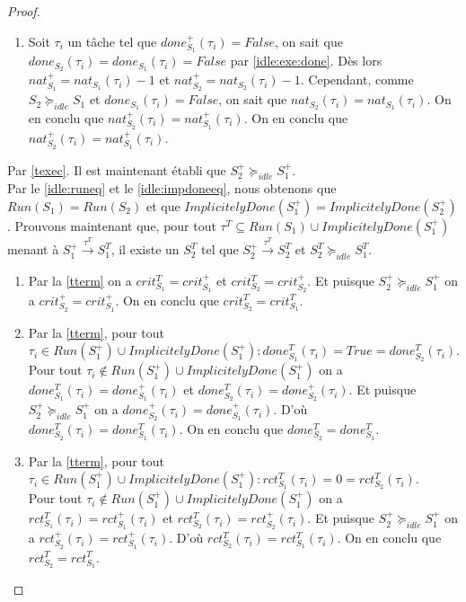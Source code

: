 \documentclass[11pt,a4paper,oneside]{book}
\theoremstyle{break}
\theoremstyle{breakplain}
\begin{document}
\begin{proof}
\begin{enumerate}
\item Soit $\tau_i$ un tâche tel que $done_{S_1}^+(\tau_i) = False$, on sait que $done_{S_2}(\tau_i) = done_{S_1}(\tau_i) = False$ par \autoref{idle:exe:done}. Dès lors $ nat_{S_1}^+ = nat_{S_1}(\tau_i)-1$ et $nat_{S_2}^+ = nat_{S_2}(\tau_i)-1$. Cependant, comme $S_2 \succeq_{idle} S_1$ et $done_{S_1}(\tau_i) = False$, on sait que $nat_{S_2}(\tau_i) = nat_{S_1}(\tau_i)$. On en conclu que $nat_{S_2}^+(\tau_i) = nat_{S_1}^+(\tau_i)$. On en conclu que $nat_{S_2}^+(\tau_i) = nat_{S_1}^+(\tau_i)$.
\end{enumerate}


Par \autoref{texec}. Il est maintenant établi que $S^+_2 \succeq_{idle} S^+_1$.\\

Par le \autoref{idle:runeq} et le \autoref{idle:impdoneeq}, nous obtenons que $Run(S_1) = Run(S_2)$ et que $ImplicitelyDone(S^+_1) = ImplicitelyDone(S_2^+)$.
Prouvons maintenant que, pour tout $\tau^T\subseteq Run(S_1) \cup ImplicitelyDone(S_1^+)$ menant à $S_1^+ \xrightarrow{\tau^T} S_1^T$, il existe un $S_2^T$ tel que $S_2^+ \xrightarrow{\tau^T} S_2^T$ et $S_2^T \succeq_{idle} S_1^T$.
\begin{enumerate}

\item Par la \autoref{tterm} on a $crit_{S_1}^T = crit_{S_1}^+$ et $crit_{S_2}^T = crit_{S_2}^+$. Et puisque $S^+_2 \succeq_{idle} S^+_1$ on a $crit_{S_2}^+= crit_{S_1}^+$. On en conclu que $crit_{S_2}^T= crit_{S_1}^T$.

\item \label{idle:term:done} Par la \autoref{tterm}, pour tout $\tau_i \in Run(S_1^+) \cup ImplicitelyDone(S_1^+) : done_{S_1}^T(\tau_i) = True = done_{S_2}^T(\tau_i)$.\\ Pour tout $\tau_i \notin Run(S_1^+) \cup ImplicitelyDone(S_1^+)$ on a $done_{S_1}^T(\tau_i) = done_{S_1}^+(\tau_i)$ et $done_{S_2}^T(\tau_i) = done_{S_2}^+(\tau_i)$. Et puisque $S^+_2 \succeq_{idle} S^+_1$ on a $done_{S_2}^+(\tau_i)= done_{S_1}^+(\tau_i)$. D'où $done_{S_2}^T(\tau_i) = done_{S_1}^T(\tau_i)$. On en conclu que $done_{S_2}^T = done_{S_1}^T$.

\item Par la \autoref{tterm}, pour tout $\tau_i \in Run(S_1^+) \cup ImplicitelyDone(S_1^+) : rct_{S_1}^T(\tau_i) = 0 = rct_{S_2}^T(\tau_i)$.\\ Pour tout $\tau_i \notin Run(S_1^+) \cup ImplicitelyDone(S_1^+)$ on a $rct_{S_1}^T(\tau_i) = rct_{S_1}^+(\tau_i)$ et $rct_{S_2}^T(\tau_i) = rct_{S_2}^+(\tau_i)$. Et puisque $S^+_2 \succeq_{idle} S^+_1$ on a $rct_{S_2}^+(\tau_i)= rct_{S_1}^+(\tau_i)$. D'où $rct_{S_2}^T(\tau_i) = rct_{S_1}^T(\tau_i)$. On en conclu que $rct_{S_2}^T = rct_{S_1}^T$.


\end{enumerate}
\end{proof}
\end{document}
